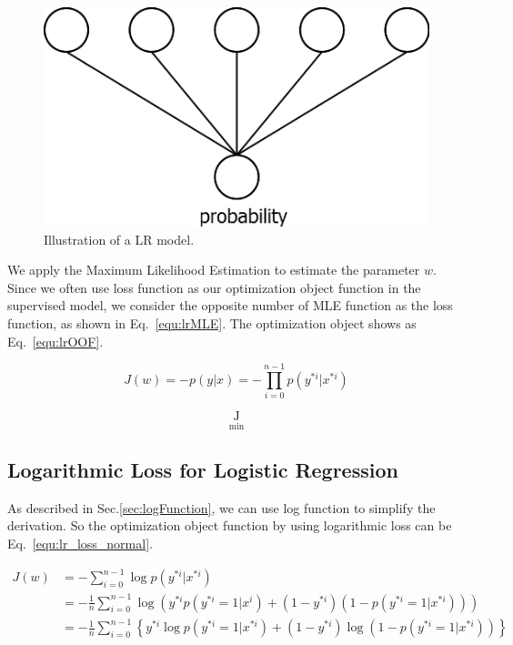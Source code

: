 \documentclass[runningheads,openany]{xhlPaper}
\begin{document}
\begin{figure}
\centering
\includegraphics[width=0.5\linewidth]{logisticRegression}
\caption{Illustration of a LR model.}
\label{fig:logisticRegression}
\end{figure}

We apply the Maximum Likelihood Estimation to estimate the parameter $w$. Since we often use loss function as our optimization object function in the supervised model, we consider the opposite number of MLE function as the loss function, as shown in Eq.~\ref{equ:lrMLE}. The optimization object shows as Eq.~\ref{equ:lrOOF}.

\begin{equation}
\label{equ:lrMLE}
{J\left( w \right)} = -p\left( {y|x} \right) = -\prod\limits_{i = 0}^{n - 1} {p\left( {{y^{*i}}|{x^{*i}}} \right)}
\end{equation}

\begin{equation}
\label{equ:lrOOF}
\mathop {J\left( w \right)}\limits_{\min }
\end{equation}

\subsection{Logarithmic Loss for Logistic Regression}
\label{sec:log_loss_logistic}
As described in Sec.\ref{sec:logFunction}, we can use log function to simplify the derivation. So the optimization object function by using logarithmic loss can be Eq.~\ref{equ:lr_loss_normal}.

\begin{equation}
\label{equ:lr_loss_normal}
\begin{aligned}
J\left( w \right) &= -\sum\limits_{i = 0}^{n - 1} {\log p\left( {{y^{*i}}|{x^{*i}}} \right)}\\
 &=  - \frac{1}{n}\sum\limits_{i = 0}^{n - 1} {\log } \left( {{y^{*i}}p\left( {{y^{*i}} = 1|{x^i}} \right) + \left( {1 - {y^{*i}}} \right)\left(1 - p\left( {{y^{*i}} = 1|{x^{*i}}} \right)\right)} \right)\\
 &=  - \frac{1}{n}\sum\limits_{i = 0}^{n - 1} \left\{{{y^{*i}}\log p\left( {{y^{*i}} = 1|{x^{*i}}} \right) + \left( {1 - {y^{*i}}} \right)\log \left(1 - p\left( {{y^{*i}} = 1|{x^{*i}}} \right) \right)}\right\} 
\end{aligned}
\end{equation}
\end{document}
